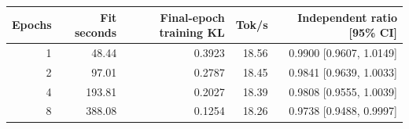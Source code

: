 \begin{tabular}{rrrrr}
\toprule
Epochs & Fit seconds & Final-epoch training KL & Tok/s & Independent ratio [95\% CI] \\
\midrule
1 & 48.44 & 0.3923 & 18.56 & 0.9900 [0.9607, 1.0149] \\
2 & 97.01 & 0.2787 & 18.45 & 0.9841 [0.9639, 1.0033] \\
4 & 193.81 & 0.2027 & 18.39 & 0.9808 [0.9555, 1.0039] \\
8 & 388.08 & 0.1254 & 18.26 & 0.9738 [0.9488, 0.9997] \\
\bottomrule
\end{tabular}
